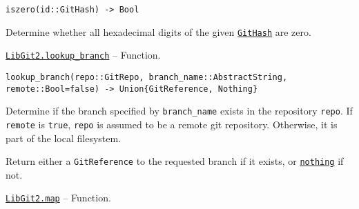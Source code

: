 \begin{adjustwidth}{2em}{0pt}


\begin{verbatim}
iszero(id::GitHash) -> Bool
\end{verbatim}

Determine whether all hexadecimal digits of the given \hyperlink{202290709580230708}{\texttt{GitHash}} are zero.



\end{adjustwidth}
\hypertarget{8872141007246166845}{}
\hyperlink{8872141007246166845}{\texttt{LibGit2.lookup\_branch}}  -- {Function.}

\begin{adjustwidth}{2em}{0pt}


\begin{verbatim}
lookup_branch(repo::GitRepo, branch_name::AbstractString, remote::Bool=false) -> Union{GitReference, Nothing}
\end{verbatim}

Determine if the branch specified by \texttt{branch\_name} exists in the repository \texttt{repo}. If \texttt{remote} is \texttt{true}, \texttt{repo} is assumed to be a remote git repository. Otherwise, it is part of the local filesystem.

Return either a \texttt{GitReference} to the requested branch if it exists, or \hyperlink{9331422207248206047}{\texttt{nothing}} if not.



\end{adjustwidth}
\hypertarget{546421066875217314}{}
\hyperlink{546421066875217314}{\texttt{LibGit2.map}}  -- {Function.}


